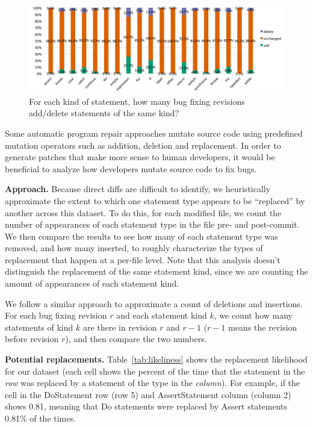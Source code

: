 \documentclass{sig-alternate-05-2015}
\begin{document}
\begin{figure}[!t] \centering \includegraphics[width=\textwidth]{StmtType} \caption{For each kind of statement, how many
	bug fixing revisions add/delete statements of the same kind?}
	\label{fig:StmtType} \end{figure}


Some automatic program repair approaches mutate source code using predefined
mutation operators such as addition, deletion and replacement. In order to
generate patches that make more sense to human developers, it would be
beneficial to analyze how developers mutate source code to fix bugs.

\vspace{1ex}\textbf{Approach.}
Because direct diffs are difficult to identify, we heuristically approximate the
extent to which one statement type appears to be ``replaced'' by another across
this dataset.  To do this, for each modified file, we count the number of
appearances of each statement type in the file pre- and post-commit.  We then
compare the results to see how many of each statement type was removed, and how
many inserted, to roughly characterize the types of replacement that happen at a
per-file level.
Note that this analysis doesn't distinguish the
replacement of the same statement kind, since we are counting the amount of
appearances of each statement kind.

We follow a similar approach to approximate a count of deletions and
insertions. 
For each bug fixing revision $r$ and each statement kind $k$, we count how many
statements of kind $k$ are there in revision $r$ and $r-1$ ($r-1$ means the
revision before revision $r$), and then compare the two numbers. 

\vspace{1ex}
\noindent\textbf{Potential replacements.} Table~\ref{tab:likeliness} shows
the replacement likelihood for our dataset 
(each cell shows the percent of the time that the statement in the \emph{row}
was replaced by a statement of the type in the \emph{column}). For example, if
the cell in the DoStatement row (row 5) and AssertStatement column (column 2)
shows 0.81, meaning that Do statements were
replaced by Assert statements 0.81\% of the times.
\end{document}
